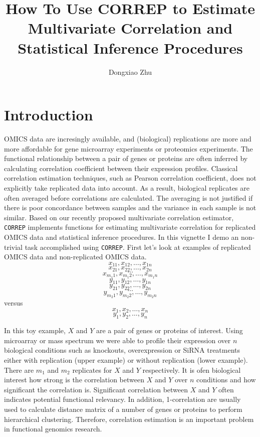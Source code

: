 \documentclass[a4paper]{article}
\title{How To Use CORREP to Estimate Multivariate Correlation and Statistical Inference Procedures}
\author{Dongxiao Zhu}
\begin{document}
\maketitle
\section{Introduction}
OMICS data are incresingly available, and (biological) replications are more and more affordable 
for gene microarray experiments or proteomics experiments. The functional relationship 
between a pair of genes or proteins are often inferred by calculating correlation 
coefficient between their expression profiles. Classical correlation estimation 
techniques, such as Pearson correlation coefficient, does not explicitly take 
replicated data into account. As a result, biological replicates are often averaged 
before correlations are calculated. The averaging is not justified if there is 
poor concordance between samples and the variance in each sample is not similar. 
Based on our recently proposed multivariate correlation estimator, \texttt{CORREP} 
implements functions for estimating multivariate correlation for replicated OMICS data 
and statistical inference procedures. In this vignette I demo an 
non-trivial task accomplished using \texttt{CORREP}. 
First let's look at examples of replicated OMICS data and non-replicated OMICS data. 
$$x_{11} , x_{12} , \ldots , x_{1n}$$
$$x_{21} , x_{22} , \ldots , x_{2n}$$
$$\dots$$
$$x_{{m_1}1} , x_{{m_1}2} , \ldots , x_{{m_1}n}$$
$$y_{11} , y_{12} , \ldots , y_{1n}$$
$$y_{21} , y_{22} , \ldots , y_{2n}$$
$$\dots$$
$$y_{{m_2}1} , y_{{m_2}2} , \ldots , y_{{m_2}n}$$
versus
$$x_{1} , x_{2} , \ldots , x_{n}$$
$$y_{1} , y_{2} , \ldots , y_{n}$$

In this toy example, $X$ and $Y$ are a pair of genes or proteins of interest.
Using microarray or mass spectrum we were able to profile their expression over
$n$ biological conditions such as knockouts, overexpression or SiRNA treatments either
with replication (upper example) or without replication (lower example). There 
are $m_1$ and $m_2$ replicates for $X$ and $Y$ respectively. It is ofen biological 
interest how strong is the correlation between $X$ and $Y$ over $n$ conditions and 
how significant the correlation is. Significant correlation between $X$ and $Y$ 
often indicates potential functional relevancy. In addition, 1-correlation are 
usually used to calculate distance matrix of a number of genes or proteins to 
perform hierarchical clustering. Therefore, correlation estimation is an important
problem in functional genomics research.
\end{document}
